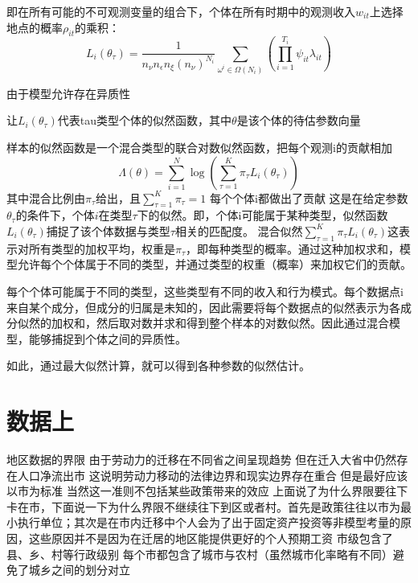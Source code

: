 \documentclass[a4paper,12pt,oneside]{book} %
\begin{document}
即在所有可能的不可观测变量的组合下，个体在所有时期中的观测收入$w_{it}$上选择地点的概率$\rho_{it}$的乘积：
\begin{equation}
  L_{i}(\theta_{\tau})=\frac{1}{n_{\nu}n_{\epsilon}n_{\xi}(n_{\nu})^{N_{i}}} \sum\limits_{\omega^{i}\in\Omega(N_{i})}(\prod\limits_{i=1}^{T_{i}} \psi_{it}\lambda_{it})
\end{equation}

由于模型允许存在异质性

让$L_{i}(\theta_{\tau})$代表tau类型个体的似然函数，其中$\theta$是该个体的待估参数向量

样本的似然函数是一个混合类型的联合对数似然函数，把每个观测i的贡献相加
\begin{equation}
\Lambda(\theta)=\sum\limits_{i=1}^{N}\log(\sum\limits_{\tau=1}^{K}\pi_{\tau}L_{i}(\theta_{\tau})) 
\end{equation}
其中混合比例由$\pi_{\tau}$给出，且$\sum\limits_{\tau=1}^{K}\pi_{\tau}=1$
每个个体i都做出了贡献
这是在给定参数$\theta_{\tau}$的条件下，个体$i$在类型$\tau$下的似然。即，个体i可能属于某种类型，似然函数
$L_i(\theta_{\tau})$捕捉了该个体数据与类型$\tau$相关的匹配度。
混合似然$\sum_{\tau=1}^{K} \pi_{\tau} L_i(\theta_{\tau})$这表示对所有类型的加权平均，权重是$\pi_{\tau}$，即每种类型的概率。通过这种加权求和，模型允许每个个体属于不同的类型，并通过类型的权重（概率）来加权它们的贡献。

每个个体可能属于不同的类型，这些类型有不同的收入和行为模式。每个数据点i来自某个成分，但成分的归属是未知的，因此需要将每个数据点的似然表示为各成分似然的加权和，然后取对数并求和得到整个样本的对数似然。因此通过混合模型，能够捕捉到个体之间的异质性。


如此，通过最大似然计算，就可以得到各种参数的似然估计。




\section{数据上}

地区数据的界限
由于劳动力的迁移在不同省之间呈现趋势 但在迁入大省中仍然存在人口净流出市 这说明劳动力移动的法律边界和现实边界存在重合 但是最好应该以市为标准 当然这一准则不包括某些政策带来的效应
上面说了为什么界限要往下卡在市，下面说一下为什么界限不继续往下到区或者村。首先是政策往往以市为最小执行单位；其次是在市内迁移中个人会为了出于固定资产投资等非模型考量的原因，这些原因并不是因为在迁居的地区能提供更好的个人预期工资
市级包含了县、乡、村等行政级别 每个市都包含了城市与农村（虽然城市化率略有不同）避免了城乡之间的划分对立
\end{document}
